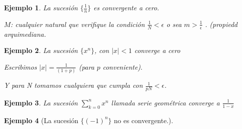 \documentclass[12pt,a4paper]{article}
\newtheorem{ejs}{Ejemplo}[section]
\begin{document}
\begin{ejs}{La sucesi\'on \( \{ \frac{1}{n}\} \)} es convergente a
  cero.

\( M \): cualquier natural que verifique la condici\'on \( \frac{1}{N}
< \epsilon\) o sea \( m > \frac{1}{\epsilon} \) . (propiedd arquimediana.

\end{ejs}
\hspace{1mm}
\begin{ejs}{La sucesi\'on \( \{ x^n \} \), con \( |x|< 1 \) converge a
  cero}

Escribimos \( |x| = \frac{1}{(1+p)} \) (para \( p \) conveniente).

Y para N tomamos cualquiera que cumpla con \( \frac{1}{pN} < \epsilon \).

\end{ejs}
\hspace{1mm}
\begin{ejs}{La sucesi\'on \( \sum_{k=0}^n x^n \) llamada \emph{serie
geom\'etrica} converge a \( \frac{1}{1-x} \)  }


\end{ejs}
\hspace{1mm}
\begin{ejs}[La sucesi\'on \( \{(-1)^n\} \) no es convergente.]


\end{ejs}
\hspace{1mm}
\end{document}
